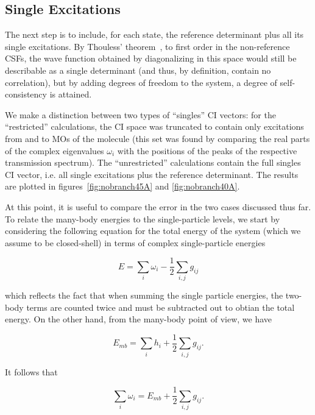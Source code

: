 \subsection{Single Excitations}
\label{subsec:singles}

The next step is to include, for each state, the reference determinant plus all
its single excitations. By Thouless' theorem~\cite{Thouless}, to first order in
the non-reference \acp{CSF}, the wave function obtained by diagonalizing in
this space would still be describable as a single determinant (and
thus, by definition, contain no correlation), but by adding degrees of freedom
to the system, a degree of self-consistency is attained. 

We make a distinction between two types of ``singles'' \ac{CI} vectors: for the
``restricted'' calculations, the \ac{CI} space was truncated to contain only
excitations from and to MOs of the molecule (this set was found by comparing
the real parts of the complex eigenvalues $\omega_i$ with the positions of the
peaks of the respective transmission spectrum). The ``unrestricted''
calculations contain the full singles \ac{CI} vector, i.e. all single
excitations plus the reference determinant. The results are plotted in
figures~\ref{fig:nobranch45A} and \ref{fig:nobranch40A}.

At this point, it is useful to compare the error in the two cases discussed
thus far. To relate the many-body energies to the single-particle levels, we
start by considering the following equation for the total energy of the system
(which we assume to be closed-shell) in terms of complex single-particle
energies

\begin{equation}
	E = \sum_i \omega_i - \frac{1}{2} \sum_{i,j} g_{ij}
	\label{eq:sptotalenergy}
\end{equation}

which reflects the fact that when summing the single particle energies, the
two-body terms are counted twice and must be subtracted out to obtian the total
energy. On the other hand, from the many-body point of view, we have

\begin{equation}
	E_{mb} = \sum_i h_i + \frac{1}{2} \sum_{i,j} g_{ij}.
	\label{eq:mbtotalenergy}
\end{equation}

It follows that

\begin{equation}
	\sum_i \omega_i = E_{mb} + \frac{1}{2} \sum_{i,j} g_{ij}.
	\label{eq:eesumcomparison}
\end{equation}

